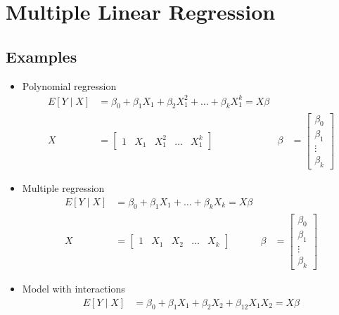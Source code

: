\documentclass[12 pt]{article}
\begin{document}
  \section{Multiple Linear Regression}
  \subsection{Examples}
  \begin{itemize}
  \item Polynomial regression
    \begin{align*}
      E[Y \mid X] &= \beta_0 + \beta_1 X_1 + \beta_2X_1^2 + \ldots + \beta_k X_1^k = X \beta
      \\ X & =
             \begin{bmatrix}
               1 & X_1 & X_1^2 & \ldots & X_1^k
             \end{bmatrix}
                                        & \beta & =
                                                  \begin{bmatrix}
                                                    \beta_0 \\ \beta_1 \\ \vdots \\ \beta_k
                                                  \end{bmatrix}
    \end{align*}
  \item Multiple regression
    \begin{align*}
      E[Y \mid X] & = \beta_0 + \beta_1 X_1 + \ldots + \beta_k X_k = X \beta
      \\ X & =
             \begin{bmatrix}
               1 & X_1 & X_2 & \ldots & X_k
             \end{bmatrix}
                                        & \beta & =
                                                  \begin{bmatrix}
                                                    \beta_0 \\ \beta_1 \\ \vdots \\ \beta_k
                                                  \end{bmatrix}
    \end{align*}
  \item Model with interactions
    \begin{align*}
      E[Y \mid X] & = \beta_0 + \beta_1 X_1 + \beta_2 X_2 + \beta_{12}X_1X_2 = X\beta

\end{align*}
\end{itemize}
\end{document}
